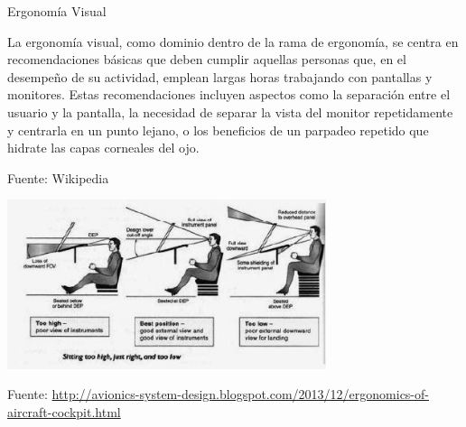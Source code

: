 \begin{frame}{Ergonom\'ia Visual}
  
La ergonom\'ia visual, como dominio dentro de la rama de ergonom\'ia, se centra en recomendaciones b\'asicas que deben cumplir aquellas personas que, en el desempe\~no de su actividad, emplean largas horas trabajando con pantallas y monitores. Estas recomendaciones incluyen aspectos como la separaci\'on entre el usuario y la pantalla, la necesidad de separar la vista del monitor repetidamente y centrarla en un punto lejano, o los beneficios de un parpadeo repetido que hidrate las capas corneales del ojo. 

{\tiny Fuente: Wikipedia}

\begin{center}
  \includegraphics[width=0.7\textwidth]{imagenes/1.1.introduccion/ergonomia_visual.jpg}
\end{center}
{\tiny Fuente: \url{http://avionics-system-design.blogspot.com/2013/12/ergonomics-of-aircraft-cockpit.html}}


\end{frame}








      

